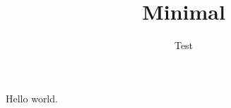 \documentclass[type=report,theme=light,language=de]{semio}
\title{Minimal}
\author{Test}
\begin{document}
\begin{Window}[title=Titel]
Hello world.
\end{Window}
\end{document}
